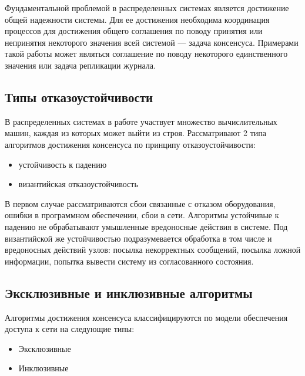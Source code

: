         Фундаментальной проблемой в распределенных системах является достижение общей надежности системы. Для ее достижения необходима координация процессов для достижения общего соглашения по поводу принятия или непринятия некоторого значения всей системой --- задача консенсуса\cite{carlsson1992consensus}. Примерами такой работы может являться соглашение по поводу некоторого единственного значения или задача репликации журнала\cite{panda2018efficient}.
        
        \subsection{Типы отказоустойчивости}
        
            В распределенных системах в работе участвует множество вычислительных машин, каждая из которых может выйти из строя. Рассматривают 2 типа алгоритмов достижения консенсуса по принципу отказоустойчивости:
            
            \begin{itemize}
                \item устойчивость к падению
                \item византийская отказоустойчивость
            \end{itemize}
            
            В первом случае рассматриваются сбои связанные с отказом оборудования, ошибки в программном обеспечении, сбои в сети. Алгоритмы устойчивые к падению не обрабатывают умышленные вредоносные действия в системе. Под византийской же устойчивостью подразумевается обработка в том числе и вредоносных действий узлов: посылка некорректных сообщений, посылка ложной информации, попытка вывести систему из согласованного состояния.
        
        \subsection{Эксклюзивные и инклюзивные алгоритмы}

            Алгоритмы достижения консенсуса классифицируются по модели обеспечения доступа к сети на следующие типы\cite{butun2020review}:
            
            \begin{itemize}
                \item Эксклюзивные
                \item Инклюзивные
            \end{itemize}
            
